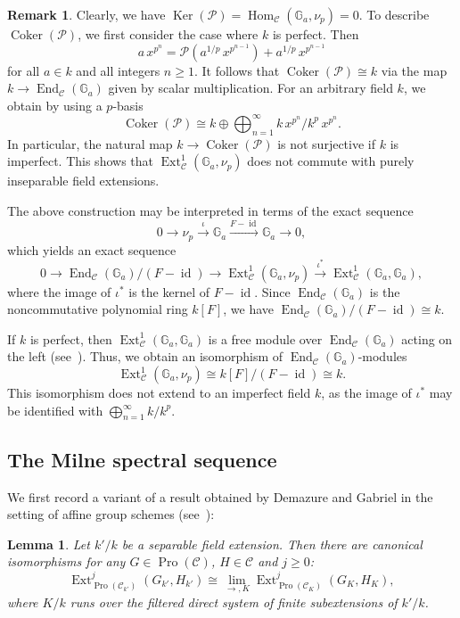 \documentclass[11pt]{article}
\newtheorem{lemm}[theo]{Lemma}
\theoremstyle{definition}
\newtheorem{rema}[theo]{Remark}
\numberwithin{equation}{section}
\newcommand\bG{{\mathbb G}}
\newcommand\cC{{\mathcal C}}
\newcommand\cP{{\mathcal P}}
\DeclareMathOperator{\id}{id}
\DeclareMathOperator{\Coker}{Coker}
\DeclareMathOperator{\End}{End}
\DeclareMathOperator{\Ext}{Ext}
\DeclareMathOperator{\Hom}{Hom}
\DeclareMathOperator{\Ker}{Ker}
\DeclareMathOperator{\Pro}{Pro}
\theoremstyle{remark}
\begin{document}
\begin{rema}
Clearly, we have $\Ker(\cP) = \Hom_{\cC}(\bG_a,\nu_p) = 0$. To describe $\Coker(\cP)$, we first consider the case where $k$ is perfect. Then
\[
a \, x^{p^n} = \cP(a^{1/p} \, x^{p^{n-1}}) + a^{1/p} \, x^{p^{n-1}}
\]
for all $a \in k$ and all integers $n \geq 1$. It follows that $\Coker(\cP) \cong k$ via the map $k \to \End_{\cC}(\bG_a)$ given by scalar multiplication. For an arbitrary field $k$, we obtain by using a $p$-basis
\[
\Coker(\cP) \cong k \oplus
\bigoplus_{n=1}^{\infty} k \, x^{p^n}/k^p \, x^{p^n}.
\]
In particular, the natural map $k \to \Coker(\cP)$ is not surjective if $k$ is imperfect. This shows that $\Ext^1_{\cC}(\bG_a,\nu_p)$ does not commute with purely inseparable field extensions.

The above construction may be interpreted in terms of the exact sequence
\[
0 \longrightarrow \nu_p
\stackrel{\iota}{\longrightarrow} \bG_a
\stackrel{F - \id}{\longrightarrow} \bG_a
\longrightarrow 0,
\]
which yields an exact sequence
\[
0 \longrightarrow \End_{\cC}(\bG_a)/(F - \id)
\longrightarrow \Ext^1_{\cC}(\bG_a,\nu_p)
\stackrel{\iota^*}{\longrightarrow}
\Ext^1_{\cC}(\bG_a, \bG_a),
\]
where the image of $\iota^*$ is the kernel of $F - \id$. Since $ \End_{\cC}(\bG_a)$ is the noncommutative polynomial ring $k[F]$, we have $\End_{\cC}(\bG_a)/(F - \id) \cong k$.

If $k$ is perfect, then $\Ext^1_{\cC}(\bG_a, \bG_a)$ is a free module over $\End_{\cC}(\bG_a)$ acting on the left (see~\cite[V.1.5.2]{DG}). Thus, we obtain an isomorphism of $\End_{\cC}(\bG_a)$-modules
\[
\Ext^1_{\cC}(\bG_a,\nu_p)
\cong k[F]/(F - \id) \cong k.
\]
This isomorphism does not extend to an imperfect field $k$, as the image of $\iota^*$ may be identified with $\bigoplus_{n = 1}^{\infty} k/k^p$.
\end{rema}

\subsection{The Milne spectral sequence}\label{subsec:milne}

We first record a variant of a result obtained by Demazure and Gabriel in the setting of affine group schemes (see~\cite[V.3.2.3]{DG}):

\begin{lemm}\label{lem:finite}
Let $k'/k$ be a separable field extension. Then there are canonical isomorphisms for any $G \in \Pro(\cC)$, $H \in \cC$ and $j \geq 0$:
\[
\Ext^j_{\Pro(\cC_{k'})}(G_{k'},H_{k'}) \cong
\lim_{\to, K} \Ext^j_{\Pro(\cC_K)}(G_K,H_K),
\]
where $K/k$ runs over the filtered direct system of finite subextensions of $k'/k$.
\end{lemm}
\end{document}
